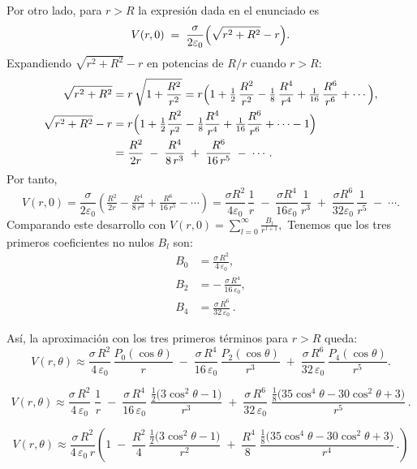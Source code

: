\documentclass[12pt]{article}
\begin{document}
Por otro lado, para \(r>R\) la expresión dada en el enunciado es
\[
V(r,0) \;=\; \frac{\sigma}{2\varepsilon_{0}} \Bigl(\sqrt{r^{2}+R^{2}} - r\Bigr).
\]
Expandiendo \(\sqrt{r^{2}+R^{2}} - r\) en potencias de \(R/r\) cuando \(r>R\):
\begin{align*}
\sqrt{r^{2}+R^{2}} 
&= r\,\sqrt{1 + \frac{R^{2}}{r^{2}}}
= r \Bigl( 1 + \tfrac{1}{2}\,\frac{R^{2}}{r^{2}} - \tfrac{1}{8}\,\frac{R^{4}}{r^{4}} 
      + \tfrac{1}{16}\,\frac{R^{6}}{r^{6}} + \cdots \Bigr), \\
%
\sqrt{r^{2}+R^{2}} - r 
&= r\Bigl(1 + \tfrac{1}{2}\frac{R^{2}}{r^{2}} - \tfrac{1}{8}\frac{R^{4}}{r^{4}} 
          + \tfrac{1}{16}\frac{R^{6}}{r^{6}} + \cdots - 1\Bigr) \\
&= \frac{R^{2}}{2r} 
   \;-\; \frac{R^{4}}{8\,r^{3}} 
   \;+\; \frac{R^{6}}{16\,r^{5}} 
   \;-\; \cdots.
\end{align*}
Por tanto,
\[
V(r,0) 
= \frac{\sigma}{2\varepsilon_{0}} 
  \left(\tfrac{R^{2}}{2r} - \tfrac{R^{4}}{8\,r^{3}} + \tfrac{R^{6}}{16\,r^{5}} - \cdots \right)
= \frac{\sigma R^{2}}{4\varepsilon_{0}}\,\frac{1}{r} 
  \;-\; \frac{\sigma R^{4}}{16\varepsilon_{0}}\,\frac{1}{r^{3}} 
  \;+\; \frac{\sigma R^{6}}{32\varepsilon_{0}}\,\frac{1}{r^{5}} 
  \;-\; \cdots.
\]
Comparando este desarrollo con
\(\displaystyle
V(r,0)=\sum_{l=0}^{\infty} \frac{B_{l}}{r^{\,l+1}},
\)
Tenemos que los tres primeros coeficientes no nulos \(B_{l}\) son:
\[
\begin{aligned}
B_{0} &= \frac{\sigma\,R^{2}}{4\,\varepsilon_{0}}, \\[6pt]
B_{2} &= -\,\frac{\sigma\,R^{4}}{16\,\varepsilon_{0}}, \\[6pt]
B_{4} &= \frac{\sigma\,R^{6}}{32\,\varepsilon_{0}}\,.
\end{aligned}
\]

Así, la aproximación con los tres primeros términos para \(r>R\) queda:
\[
V(r,\theta)
\approx
\frac{\sigma\,R^{2}}{4\,\varepsilon_{0}}\,\frac{P_{0}(\cos\theta)}{r}
\;-\;
\frac{\sigma\,R^{4}}{16\,\varepsilon_{0}}\,\frac{P_{2}(\cos\theta)}{r^{3}}
\;+\;
\frac{\sigma\,R^{6}}{32\,\varepsilon_{0}}\,\frac{P_{4}(\cos\theta)}{r^{5}}.
\]

\[
V(r,\theta)\approx
\frac{\sigma\,R^{2}}{4\,\varepsilon_{0}}\;\frac{1}{r}
\;-\;
\frac{\sigma\,R^{4}}{16\,\varepsilon_{0}}\;\frac{\displaystyle \frac{1}{2}\bigl(3\cos^{2}\theta - 1\bigr)}{r^{3}}
\;+\;
\frac{\sigma\,R^{6}}{32\,\varepsilon_{0}}\;\frac{\displaystyle \frac{1}{8}\bigl(35\cos^{4}\theta - 30\cos^{2}\theta + 3\bigr)}{r^{5}}\,.
\]

\[
V(r,\theta)\approx
\frac{\sigma\,R^{2}}{4\,\varepsilon_{0}\,r} \left( 
1 \;-\;
\frac{R^{2}}{4}\,\frac{\displaystyle \frac{1}{2}\bigl(3\cos^{2}\theta - 1\bigr)}{r^{2}}
\;+\;
\frac{R^{4}}{8\,}\;\frac{\displaystyle \frac{1}{8}\bigl(35\cos^{4}\theta - 30\cos^{2}\theta + 3\bigr)}{r^{4}}\,.
\right)\]
\bigskip
\end{document}
